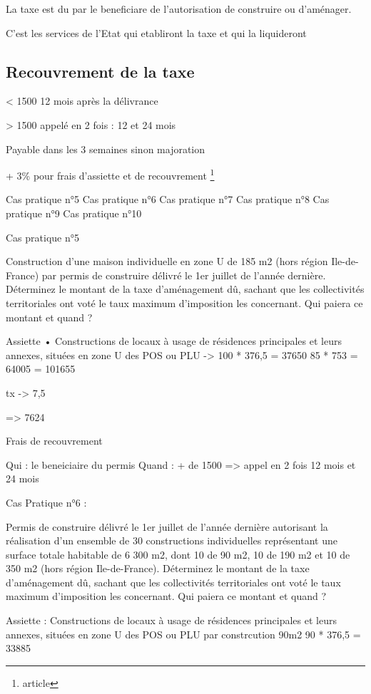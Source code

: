 		La taxe est du par le beneficiare de l'autorisation de construire ou d'aménager.

		C'est les services de l'Etat qui etabliront la taxe et qui la liquideront

	\subsection{Recouvrement de la taxe}

		< 1500 12 mois après la délivrance

		> 1500 appelé en 2 fois : 12 et 24 mois

		Payable dans les 3 semaines sinon majoration

		+ 3\% pour frais d'assiette et de recouvrement \footnote{article}

		Cas pratique n°5
		Cas pratique n°6
		Cas pratique n°7
		Cas pratique n°8
		Cas pratique n°9
		Cas pratique n°10

		Cas pratique n°5

		Construction d'une maison individuelle en zone U de 185 m2 (hors région Ile-de-France) par permis de construire délivré le 1er juillet de l’année dernière.
		Déterminez le montant de la taxe d’aménagement dû, sachant que les collectivités territoriales ont voté le taux maximum d’imposition les concernant.
		Qui paiera ce montant et quand ?

		Assiette
		• Constructions de locaux à usage de résidences principales et leurs annexes, situées en zone U des POS ou PLU -> 100 * 376,5 = 37650
		85 * 753 = 64005
		= 101655

		tx -> 7,5

		=> 7624

		Frais de recouvrement

		Qui : le beneiciaire du permis
		Quand : + de 1500 => appel en 2 fois 12 mois et 24 mois

Cas Pratique n°6 :

Permis de construire délivré le 1er juillet de l’année dernière autorisant la réalisation d'un ensemble de 30 constructions individuelles représentant une surface totale habitable de 6 300 m2, dont 10 de 90 m2, 10 de 190 m2 et 10 de 350 m2 (hors région Ile-de-France).
Déterminez le montant de la taxe d’aménagement dû, sachant que les collectivités territoriales ont voté le taux maximum d’imposition les concernant.
Qui paiera ce montant et quand ?


		Assiette :
		Constructions de locaux à usage
	de résidences principales et leurs annexes, situées en zone U des POS ou PLU
		par constrcution
		90m2
			90 * 376,5 = 33885

